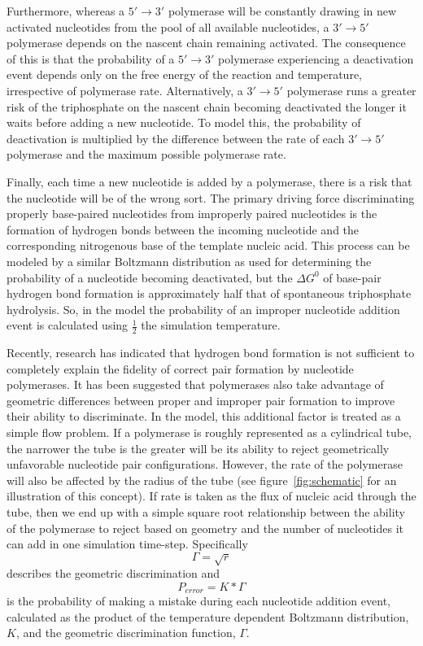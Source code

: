 Furthermore, whereas a $5'\to3'$ polymerase will be constantly drawing in new activated nucleotides from the pool of all available nucleotides, a $3'\to5'$ polymerase depends on the nascent chain remaining activated. The consequence of this is that the probability of a $5'\to3'$ polymerase experiencing a deactivation event depends only on the free energy of the reaction and temperature, irrespective of polymerase rate. Alternatively, a $3'\to5'$ polymerase runs a greater risk of the triphosphate on the nascent chain becoming deactivated the longer it waits before adding a new nucleotide. To model this, the probability of deactivation is multiplied by the difference between the rate of each $3'\to5'$ polymerase and the maximum possible polymerase rate.

Finally, each time a new nucleotide is added by a polymerase, there is a risk that the nucleotide will be of the wrong sort. The primary driving force discriminating properly base-paired nucleotides from improperly paired nucleotides is the formation of hydrogen bonds between the incoming nucleotide and the corresponding nitrogenous base of the template nucleic acid. This process can be modeled by a similar Boltzmann distribution as used for determining the probability of a nucleotide becoming deactivated, but the $\Delta G^0$ of base-pair hydrogen bond formation is approximately half that of spontaneous triphosphate hydrolysis. So, in the model the probability of an improper nucleotide addition event is calculated using $\frac{1}{2}$ the simulation temperature.

Recently, research has indicated that hydrogen bond formation is not sufficient to completely explain the fidelity of correct pair formation by nucleotide polymerases. It has been suggested that polymerases also take advantage of geometric differences between proper and improper pair formation to improve their ability to discriminate. In the model, this additional factor is treated as a simple flow problem. If a polymerase is roughly represented as a cylindrical tube, the narrower the tube is the greater will be its ability to reject geometrically unfavorable nucleotide pair configurations. However, the rate of the polymerase will also be affected by the radius of the tube (see figure~\ref{fig:schematic} for an illustration of this concept). If rate is taken as the flux of nucleic acid through the tube, then we end up with a simple square root relationship between the ability of the polymerase to reject based on geometry and the number of nucleotides it can add in one simulation time-step. Specifically\[
	\Gamma = \sqrt{r}
\]
describes the geometric discrimination and\[
	P_{error} = K * \Gamma
\]
is the probability of making a mistake during each nucleotide addition event, calculated as the product of the temperature dependent Boltzmann distribution, $K$, and the geometric discrimination function, $\Gamma$.

